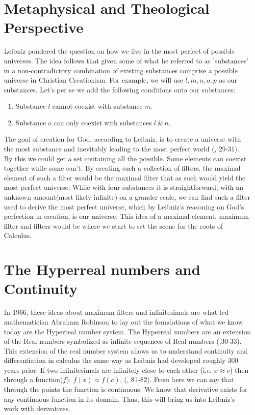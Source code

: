 \documentclass[12pt]{report}
\begin{document}
\section*{Metaphysical and Theological Perspective}
Leibniz pondered the question on how we live in the most perfect of possible universes.
The idea follows that given some of what he referred to as 'substances' in a non-contradictory combination of existing substances comprise a possible universe in Christian Creationism.
For example, we will use $l, m, n, o, p$ as our substances.
Let's per se we add the following conditions onto our substances:
    \begin{enumerate}
        \item Substance $l$ cannot coexist with substance $m$.
        \item Substance $o$ can only coexist with substances $l \ \& \ n$.
    \end{enumerate}
The goal of creation for God, according to Leibniz, is to create a universe with the most substance and inevitably leading to the most perfect world (, 29-31). \\
By this we could get a set containing all the possible.
Some elements can coexist together while some can't.
By creating such a collection of filters, the maximal element of such a filter would be the maximal filter that as such would yield the most perfect universe.
While with four substances it is straightforward, with an unknown amount(most likely infinite) on a grander scale, we can find such a filter used to derive the most perfect universe, which by Leibniz's reasoning on God's perfection in creation, is our universe.
This idea of a maximal element, maximum filter and filters would be where we start to set the scene for the roots of Calculus.

    \section*{The Hyperreal numbers and Continuity}
In 1966, these ideas about maximum filters and infinitesimals are what led mathematician Abraham Robinson to lay out the foundations of what we know today are the Hyperreal number system.
The Hyperreal numbers are an extension of the Real numbers symbolized as infinite sequences of Real numbers (,30-33).
This extension of the real number system allows us to understand continuity and differentiation in calculus the same way as Leibniz had developed roughly 300 years prior.
If two infinitesimals are infinitely close to each other (i.e. $ x \approx c$) then through a function($f$):  $f(x) \approx  f(c)$, (, 81-82).
From here we can say that through the points the function is continuous.
We know that derivative exists for any continuous function in its domain.
Thus, this will bring us into Leibniz's work with derivatives.
\end{document}

